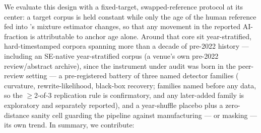 \documentclass[conference]{IEEEtran}
\begin{document}
We evaluate this design with a fixed-target, swapped-reference protocol at its center: a target corpus is held constant while only the age of the human reference fed into \cite{MonitorAIScale}'s mixture estimator changes, so that any movement in the reported AI-fraction is attributable to anchor age alone. Around that core sit year-stratified, hard-timestamped corpora spanning more than a decade of pre-2022 history --- including an SE-native year-stratified corpus (a venue's own pre-2022 review/abstract archive), since the instrument under audit was born in the peer-review setting --- a pre-registered battery of three named detector families (\cite{DetectGPT} curvature, \cite{LearnToDistance} rewrite-likelihood, \cite{DnR} black-box recovery; families named before any data, so the $\geq$2-of-3 replication rule is confirmatory, and any later-added family is exploratory and separately reported), and a year-shuffle placebo plus a zero-distance sanity cell guarding the pipeline against manufacturing --- or masking --- its own trend. In summary, we contribute:
\end{document}
